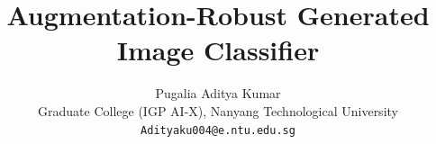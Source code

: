 \documentclass[10pt,twocolumn,letterpaper]{article}
\title{Augmentation-Robust Generated Image Classifier}
\author{Pugalia Aditya Kumar\\
Graduate College (IGP AI-X), Nanyang Technological University\\
{\tt\small Adityaku004@e.ntu.edu.sg}
}
\begin{document}
\maketitle






{
    \small
    
    
}
\end{document}

